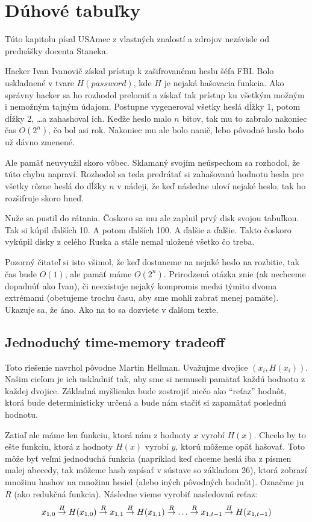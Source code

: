 \section{Dúhové tabuľky}

\begin{poznamka}
Túto kapitolu písal USAmec z vlastných znalostí a zdrojov nezávisle od prednášky docenta Staneka.
\end{poznamka}

Hacker Ivan Ivanovič získal prístup k zašifrovanému heslu šéfa FBI.
Bolo uskladnené v tvare $H(password)$, kde $H$ je nejaká hašovacia funkcia.
Ako správny hacker sa ho rozhodol prelomiť a získať tak prístup
ku všetkým možným i nemožným tajným údajom.
Postupne vygeneroval všetky heslá dĺžky 1, potom dĺžky 2, \dots a
zahashoval ich.
Keďže heslo malo $n$ bitov, tak mu to zabralo nakoniec čas $O(2^n)$,
čo bol asi rok. Nakoniec mu ale bolo nanič, lebo pôvodné heslo bolo už
dávno zmenené.

Ale pamäť neuvyužil skoro vôbec.
Sklamaný svojím neúspechom sa rozhodol, že túto chybu napraví.
Rozhodol sa teda predrátať si zahašovanú hodnotu hesla
pre všetky rôzne heslá do dĺžky $n$ v nádeji,
že keď následne uloví nejaké heslo, tak ho rozšifruje skoro hneď.

Nuže sa pustil do rátania. Čoskoro sa mu ale zaplnil prvý disk svojou tabuľkou.
Tak si kúpil ďalších 10. A potom ďalších 100. A ďalšie a ďalšie.
Takto čoskoro vykúpil disky z celého Ruska
a stále nemal uložené všetko čo treba.

Pozorný čitateľ si isto všimol, že keď dostaneme na nejaké heslo na rozbitie,
tak čas bude $O(1)$, ale pamäť máme $O(2^n)$.
Prirodzená otázka znie (ak nechceme dopadnúť ako Ivan),
či neexistuje nejaký kompromis medzi týmito dvoma extrémami
(obetujeme trochu času, aby sme mohli zabrať menej pamäte).
Ukazuje sa, že áno. Ako na to sa dozviete v ďalšom texte.

\subsection{Jednoduchý time-memory tradeoff}
Toto riešenie navrhol pôvodne Martin Hellman.
Uvažujme dvojice $(x_i, H(x_i))$.
Našim cieľom je ich uskladniť tak, aby sme si nemuseli
pamätať každú hodnotu z každej dvojice. 
Základná myšlienka bude zostrojiť niečo ako ``reťaz'' hodnôt, ktorá
bude deterministicky určená a bude nám stačiť si zapamätať poslednú
hodnotu.

Zatiaľ ale máme len funkciu, ktorá nám z hodnoty $x$ vyrobí $H(x)$.
Chcelo by to ešte funkciu, ktorá z hodnoty $H(x)$ vyrobí $y$,
ktorú môžeme opäť hašovať.
Toto môže byť veľmi jednoduchá funkcia (napríklad keď chceme heslá iba
z písmen malej abecedy, tak môžeme hash zapísať v sústave so základom 26),
ktorá zobrazí množinu hashov na množinu hesiel (alebo iných pôvodných hodnôt).
Označme ju $R$ (ako redukčná funkcia).
Následne vieme vyrobiť nasledovnú reťaz:
\begin{equation*}
    x_{1,0} \toa{H} H(x_{1,0}) \toa{R} 
    x_{1,1} \toa{H} H(x_{1,1}) \toa{R} \dots \toa{R} 
    x_{1,t-1} \toa{H} H(x_{1,t-1})
\end{equation*}

